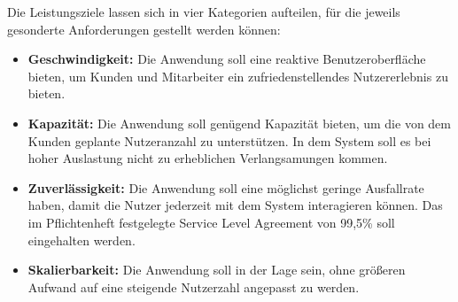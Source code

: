 Die Leistungsziele lassen sich in vier Kategorien aufteilen, für die jeweils gesonderte Anforderungen
gestellt werden können:

\begin{itemize}
    \item \textbf{Geschwindigkeit:}
    \newline Die Anwendung soll eine reaktive Benutzeroberfläche bieten,
    um Kunden und Mitarbeiter ein zufriedenstellendes Nutzererlebnis zu bieten.
    \item \textbf{Kapazität:}
    \newline Die Anwendung soll genügend Kapazität bieten, um die von dem Kunden geplante Nutzeranzahl
    zu unterstützen.
    In dem System soll es bei hoher Auslastung nicht zu erheblichen Verlangsamungen kommen.
    \item \textbf{Zuverlässigkeit:}
    \newline Die Anwendung soll eine möglichst geringe Ausfallrate haben, damit die Nutzer jederzeit mit dem
    System interagieren können.
    Das im Pflichtenheft festgelegte Service Level Agreement von 99,5\% soll eingehalten werden.
    \item \textbf{Skalierbarkeit:}
    \newline Die Anwendung soll in der Lage sein, ohne größeren Aufwand auf eine steigende Nutzerzahl angepasst zu werden.
\end{itemize}